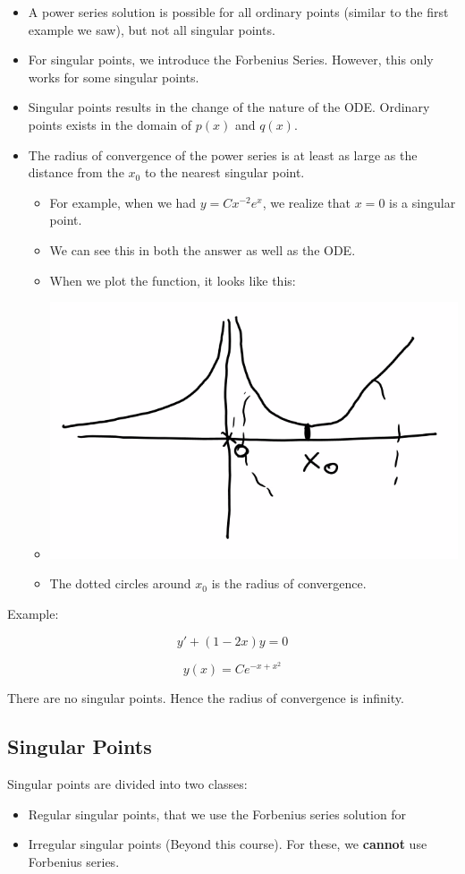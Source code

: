 \documentclass{article}
\begin{document}
\begin{itemize}
    \item A power series solution is possible for all ordinary points (similar to the first example we saw), but not all singular points. 
    \item For singular points, we introduce the Forbenius Series. However, this only works for some singular points. 
    \item Singular points results in the change of the nature of the ODE. Ordinary points exists in the domain of $p(x)$ and $q(x)$. 
    \item The radius of convergence of the power series is at least as large as the distance from the $x_0$ to the nearest singular point.
    \begin{itemize}
        \item For example, when we had $y = C x^{-2} e^x$, we realize that $x=  0$ is a singular point. 
        \item We can see this in both the answer as well as the ODE. \item When we plot the function, it looks like this:
        \item \includegraphics[width = 0.5 \textwidth]{image6.png}
        \item The dotted circles around $x_0$ is the radius of convergence. 
    \end{itemize}
\end{itemize}

Example:

$$y' + (1 - 2x)y =0$$

$$y(x) = C e^{-x + x^2}$$

There are no singular points. Hence the radius of convergence is infinity. 

\subsection{Singular Points}

Singular points are divided into two classes:

\begin{itemize}
    \item Regular singular points, that we use the Forbenius series solution for
    \item Irregular singular points (Beyond this course). For these, we \textbf{cannot} use Forbenius series. 
\end{itemize}
\end{document}

